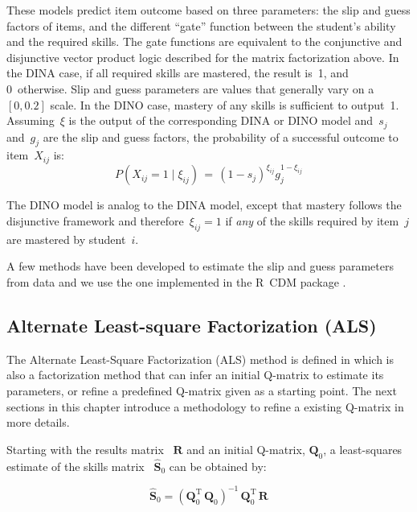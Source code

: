 These models predict item outcome based on three parameters: the slip and guess factors of items, and the different ``gate'' function between the student's ability and the required skills.  The gate functions are equivalent to the conjunctive and disjunctive vector product logic described for the matrix factorization above.  In the DINA case, if all required skills are mastered, the result is~1, and 0~otherwise. Slip and guess parameters are values that generally vary on a~$[0,0.2]$ scale. In the DINO case, mastery of any skills is sufficient to output~1.  Assuming~$\xi$ is the output of the corresponding DINA or DINO model and~$s_j$ and~$g_j$ are the slip and guess factors, the probability of a successful outcome to item~$X_{ij}$ is:
\begin{equation}
 P(X_{ij} \!=\! 1 \; | \; \xi_{ij}) \,=\, (1-s_j)^{\xi_{ij}} g_j^{1-\xi_{ij}}
\label{DinoEQ}
\end{equation}

The DINO model is analog to the DINA model, except that mastery follows the disjunctive framework and therefore~$\xi_{ij}=1$ if \textit{any} of the skills required by item~$j$ are mastered by student~$i$.

A few methods have been developed to estimate the slip and guess parameters from data and we use the one implemented in the R~CDM package \citep{Robitzsch2012}.

\subsection{Alternate Least-square Factorization (ALS)}
\label{ALS-Def}

The {Alternate Least-Square Factorization (ALS)} method is defined in \cite{Desmarais2013aied} which is also a factorization method that can infer an initial Q-matrix to estimate its parameters, or refine a predefined Q-matrix given as a starting point. The next sections in this chapter introduce a methodology to refine a existing Q-matrix in more details.

Starting with the results matrix ~$\mathbf{R}$ and an initial Q-matrix, $\mathbf{Q}_0$, a least-squares estimate of the skills matrix ~$\mathbf{\hat{S}}_0$ can be obtained by:

\begin{equation}
    \mathbf{\hat{S}}_0 = (\mathbf{Q}_0^{\mathrm{T}}  \, \mathbf{Q}_0)^{-1} \, \mathbf{Q}_0^{\mathrm{T}} \, \mathbf{R} \label{eq:shat1}
\end{equation}


